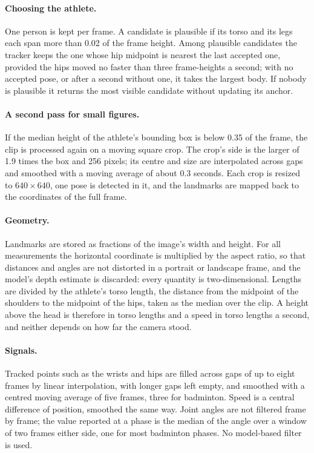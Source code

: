 \documentclass[sigconf,nonacm]{acmart}
\begin{document}
\paragraph{Choosing the athlete.}
One person is kept per frame. A candidate is plausible if its torso and its legs each span
more than 0.02 of the frame height. Among plausible candidates the tracker keeps the one whose
hip midpoint is nearest the last accepted one, provided the hips moved no faster than three
frame-heights a second; with no accepted pose, or after a second without one, it takes the
largest body. If nobody is plausible it returns the most visible candidate without updating
its anchor.

\paragraph{A second pass for small figures.}
If the median height of the athlete's bounding box is below 0.35 of the frame, the clip is
processed again on a moving square crop. The crop's side is the larger of 1.9 times the box
and 256 pixels; its centre and size are interpolated across gaps and smoothed with a moving
average of about 0.3 seconds. Each crop is resized to $640\times640$, one pose is detected in
it, and the landmarks are mapped back to the coordinates of the full frame.

\paragraph{Geometry.}
Landmarks are stored as fractions of the image's width and height. For all measurements the
horizontal coordinate is multiplied by the aspect ratio, so that distances and angles are not
distorted in a portrait or landscape frame, and the model's depth estimate is discarded: every
quantity is two-dimensional. Lengths are divided by the athlete's torso length, the distance
from the midpoint of the shoulders to the midpoint of the hips, taken as the median over the
clip. A height above the head is therefore in torso lengths and a speed in torso lengths a
second, and neither depends on how far the camera stood.

\paragraph{Signals.}
Tracked points such as the wrists and hips are filled across gaps of up to eight frames by
linear interpolation, with longer gaps left empty, and smoothed with a centred moving average
of five frames, three for badminton. Speed is a central difference of position, smoothed the
same way. Joint angles are not filtered frame by frame; the value reported at a phase is the
median of the angle over a window of two frames either side, one for most badminton phases.
No model-based filter is used.
\end{document}
